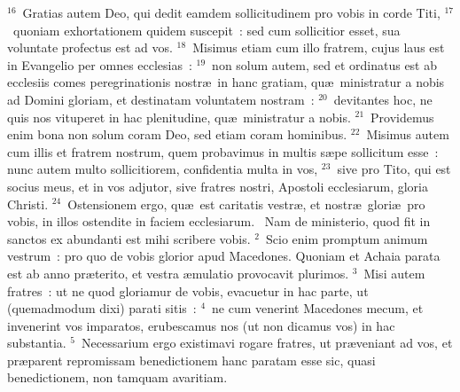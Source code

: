 ${}^{16}$~Gratias autem Deo, qui dedit eamdem sollicitudinem pro vobis in corde Titi,
${}^{17}$~quoniam exhortationem quidem suscepit~: sed cum sollicitior esset, sua voluntate profectus est ad vos.
${}^{18}$~Misimus etiam cum illo fratrem, cujus laus est in Evangelio per omnes ecclesias~:
${}^{19}$~non solum autem, sed et ordinatus est ab ecclesiis comes peregrinationis nostr\ae\ in hanc gratiam, qu\ae\ ministratur a nobis ad Domini gloriam, et destinatam voluntatem nostram~:
${}^{20}$~devitantes hoc, ne quis nos vituperet in hac plenitudine, qu\ae\ ministratur a nobis.
${}^{21}$~Providemus enim bona non solum coram Deo, sed etiam coram hominibus.
${}^{22}$~Misimus autem cum illis et fratrem nostrum, quem probavimus in multis s\ae pe sollicitum esse~: nunc autem multo sollicitiorem, confidentia multa in vos,
${}^{23}$~sive pro Tito, qui est socius meus, et in vos adjutor, sive fratres nostri, Apostoli ecclesiarum, gloria Christi.
${}^{24}$~Ostensionem ergo, qu\ae\ est caritatis vestr\ae , et nostr\ae\ glori\ae\ pro vobis, in illos ostendite in faciem ecclesiarum.
~\lettrine[lines=10,image=true,loversize=0.05,lraise=-0.03]{N}{}am de ministerio, quod fit in sanctos ex abundanti est mihi scribere vobis.
${}^{2}$~Scio enim promptum animum vestrum~: pro quo de vobis glorior apud Macedones. Quoniam et Achaia parata est ab anno pr\ae terito, et vestra \ae mulatio provocavit plurimos.
${}^{3}$~Misi autem fratres~: ut ne quod gloriamur de vobis, evacuetur in hac parte, ut (quemadmodum dixi) parati sitis~:
${}^{4}$~ne cum venerint Macedones mecum, et invenerint vos imparatos, erubescamus nos (ut non dicamus vos) in hac substantia.
${}^{5}$~Necessarium ergo existimavi rogare fratres, ut pr\ae veniant ad vos, et pr\ae parent repromissam benedictionem hanc paratam esse sic, quasi benedictionem, non tamquam avaritiam.


